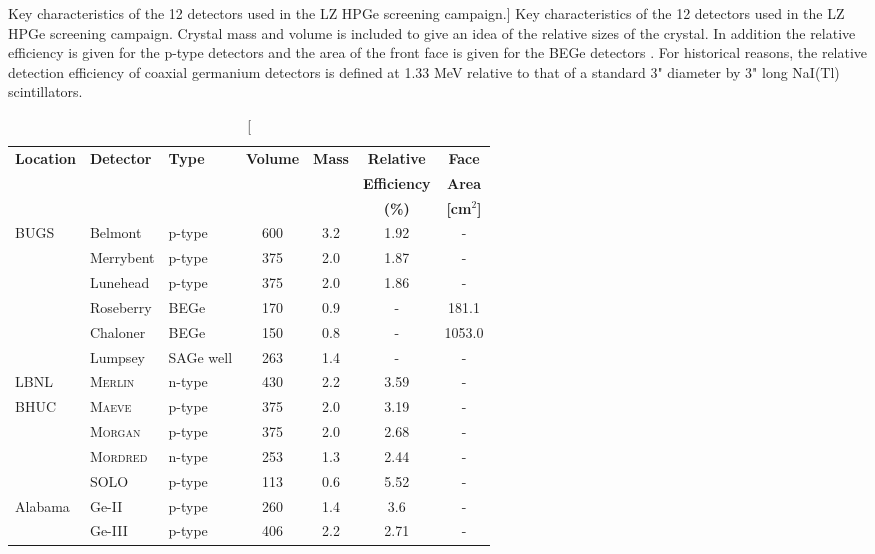 \begin{table}[h]
\centering
\caption
[Key characteristics of the 12 detectors used in the LZ HPGe screening campaign.]
{Key characteristics of the 12 detectors used in the LZ HPGe screening campaign. Crystal mass and volume is included to give an idea of the relative sizes of the crystal. In addition the relative efficiency is given for the p-type detectors and the area of the front face is given for the BEGe detectors \cite{lz_screening}. For historical reasons, the relative detection efficiency of coaxial
germanium detectors is defined at 1.33 MeV relative to that of a standard 3" diameter by 3" long NaI(Tl) scintillators.}
    \label{tab:GeDetInf}
    \vspace{1mm}

    \renewcommand{\arraystretch}{1.2}
    \begin{tabularx}{1.0\linewidth}{@{\extracolsep{\fill}}lllcccc}
    \toprule
    
    \multirow{3}{*}{\textbf{Location}} & %
    \multirow{3}{*}{\textbf{Detector}} & %
    \multirow{3}{*}{\textbf{Type}} & %
    \multirow{2}{*}{\textbf{Volume}} & %
    \multirow{2}{*}{\textbf{Mass}} & %
    \textbf{Relative} & %
    \textbf{Face} %
    \\
    &
    & %
    & %
    \multirow{2}{*}{\textbf{[cm$^{3}$]}} & %
    \multirow{2}{*}{\textbf{[kg]}} & %
    \textbf{Efficiency} & %
    \textbf{Area} %
    \\
    &
    & %
    & %
    & %
    & %
    \textbf{(\%)} & %
    \textbf{[cm$^{2}$]} %
    \\
    \hline
    \hline

    \multirow{6}{*}{BUGS} & Belmont & p-type & 600 & 3.2 & 1.92 & - \\
    & Merrybent & p-type & 375 & 2.0 & 1.87 & - \\
    & Lunehead & p-type & 375 & 2.0 & 1.86 & - \\
    & Roseberry & BEGe & 170 & 0.9 & - & 181.1 \\
    & Chaloner & BEGe & 150 & 0.8 & - & 1053.0 \\
    & Lumpsey & SAGe well & 263 & 1.4 & - & - \\
    \hline
    LBNL & \textsc{Merlin} & n-type & 430 & 2.2 &3.59 & - \\
    \hline
    \multirow{4}{*}{BHUC}& \textsc{Maeve} & p-type & 375 & 2.0 &3.19 & - \\
    & \textsc{Morgan} & p-type & 375 & 2.0 & 2.68 & - \\
    & \textsc{Mordred} & n-type & 253 & 1.3 &2.44 & - \\
    & SOLO & p-type & 113 & 0.6 & 5.52 & - \\
    \hline
    \multirow{2}{*}{Alabama} & Ge-II  & p-type & 260 & 1.4 & 3.6  & - \\
    & Ge-III & p-type & 406 & 2.2 & 2.71 & - \\
    
    \bottomrule
    \end{tabularx}
\end{table}